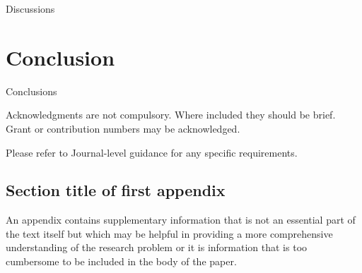 \documentclass[sn-mathphys,Numbered]{sn-jnl}%
\theoremstyle{thmstyleone}%
\theoremstyle{thmstyletwo}%
\theoremstyle{thmstylethree}%
\begin{document}
Discussions

\section{Conclusion}\label{sec13}

Conclusions

\backmatter



Acknowledgments are not compulsory. Where included they should be brief. Grant or contribution numbers may be acknowledged.

Please refer to Journal-level guidance for any specific requirements.


\begin{appendices}

\section{Section title of first appendix}\label{secA1}

An appendix contains supplementary information that is not an essential part of the text itself but which may be helpful in providing a more comprehensive understanding of the research problem or it is information that is too cumbersome to be included in the body of the paper.




\end{appendices}


\end{document}
